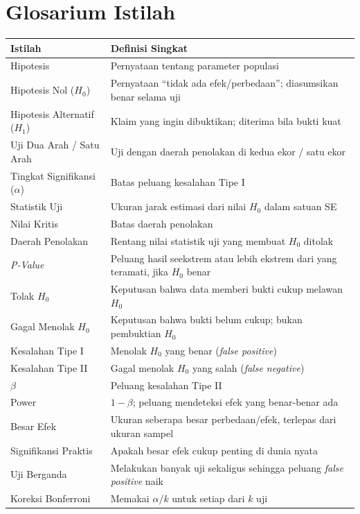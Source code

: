 \documentclass[
  indonesian,
  letterpaper,
]{book}
\newcounter{none} %
\begin{document}
\chapter{Glosarium Istilah}\label{glosarium-istilah-1}

{\def\LTcaptype{none} %
\begin{longtable}[]{@{}
  >{\raggedright\arraybackslash}p{}
  >{\raggedright\arraybackslash}p{}@{}}
\toprule\noalign{}
\begin{minipage}[b]{\linewidth}\raggedright
Istilah
\end{minipage} & \begin{minipage}[b]{\linewidth}\raggedright
Definisi Singkat
\end{minipage} \\
\midrule\noalign{}
\endhead
\bottomrule\noalign{}
\endlastfoot
Hipotesis & Pernyataan tentang parameter populasi \\
Hipotesis Nol (\(H_0\)) & Pernyataan ``tidak ada efek/perbedaan'';
diasumsikan benar selama uji \\
Hipotesis Alternatif (\(H_1\)) & Klaim yang ingin dibuktikan; diterima
bila bukti kuat \\
Uji Dua Arah / Satu Arah & Uji dengan daerah penolakan di kedua ekor /
satu ekor \\
Tingkat Signifikansi (\(\alpha\)) & Batas peluang kesalahan Tipe I \\
Statistik Uji & Ukuran jarak estimasi dari nilai \(H_0\) dalam satuan
SE \\
Nilai Kritis & Batas daerah penolakan \\
Daerah Penolakan & Rentang nilai statistik uji yang membuat \(H_0\)
ditolak \\
\emph{P-Value} & Peluang hasil seekstrem atau lebih ekstrem dari yang
teramati, jika \(H_0\) benar \\
Tolak \(H_0\) & Keputusan bahwa data memberi bukti cukup melawan
\(H_0\) \\
Gagal Menolak \(H_0\) & Keputusan bahwa bukti belum cukup; bukan
pembuktian \(H_0\) \\
Kesalahan Tipe I & Menolak \(H_0\) yang benar (\emph{false positive}) \\
Kesalahan Tipe II & Gagal menolak \(H_0\) yang salah (\emph{false
negative}) \\
\(\beta\) & Peluang kesalahan Tipe II \\
Power & \(1 - \beta\); peluang mendeteksi efek yang benar-benar ada \\
Besar Efek & Ukuran seberapa besar perbedaan/efek, terlepas dari ukuran
sampel \\
Signifikansi Praktis & Apakah besar efek cukup penting di dunia nyata \\
Uji Berganda & Melakukan banyak uji sekaligus sehingga peluang
\emph{false positive} naik \\
Koreksi Bonferroni & Memakai \(\alpha/k\) untuk setiap dari \(k\) uji \\
\end{longtable}
}
\end{document}
